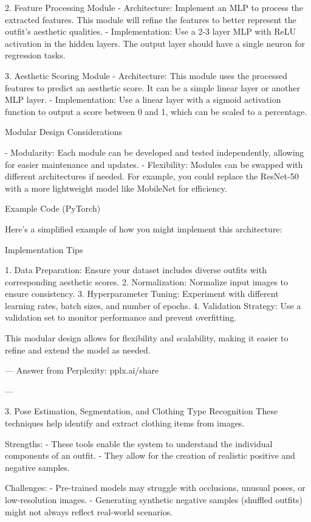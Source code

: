 2. Feature Processing Module
   - Architecture: Implement an MLP to process the extracted features. This module will refine the features to better represent the outfit's aesthetic qualities.
   - Implementation: Use a 2-3 layer MLP with ReLU activation in the hidden layers. The output layer should have a single neuron for regression tasks.

3. Aesthetic Scoring Module
   - Architecture: This module uses the processed features to predict an aesthetic score. It can be a simple linear layer or another MLP layer.
   - Implementation: Use a linear layer with a sigmoid activation function to output a score between 0 and 1, which can be scaled to a percentage.

Modular Design Considerations

- Modularity: Each module can be developed and tested independently, allowing for easier maintenance and updates.
- Flexibility: Modules can be swapped with different architectures if needed. For example, you could replace the ResNet-50 with a more lightweight model like MobileNet for efficiency.

Example Code (PyTorch)

Here's a simplified example of how you might implement this architecture:

Implementation Tips

1. Data Preparation: Ensure your dataset includes diverse outfits with corresponding aesthetic scores.
2. Normalization: Normalize input images to ensure consistency.
3. Hyperparameter Tuning: Experiment with different learning rates, batch sizes, and number of epochs.
4. Validation Strategy: Use a validation set to monitor performance and prevent overfitting.

This modular design allows for flexibility and scalability, making it easier to refine and extend the model as needed.

---
Answer from Perplexity: pplx.ai/share


---

3. Pose Estimation, Segmentation, and Clothing Type Recognition
These techniques help identify and extract clothing items from images.

Strengths:
- These tools enable the system to understand the individual components of an outfit.
- They allow for the creation of realistic positive and negative samples.

Challenges:
- Pre-trained models may struggle with occlusions, unusual poses, or low-resolution images.
- Generating synthetic negative samples (shuffled outfits) might not always reflect real-world scenarios.

